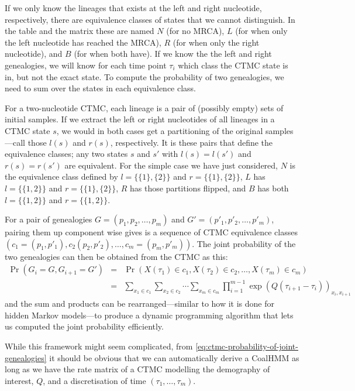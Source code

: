 \documentclass[graybox]{svmult}
\begin{document}
If we only know the lineages that exists at the left and right nucleotide, respectively, there are equivalence classes of states that we cannot distinguish. In the table and the matrix these are named $N$ (for no MRCA), $L$ (for when only the left nucleotide has reached the MRCA), $R$ (for when only the right nucleotide), and $B$ (for when both have). If we know the the left and right genealogies, we will know for each time point $\tau_i$ which class the CTMC state is in, but not the exact state. To compute the probability of two genealogies, we need to sum over the states in each equivalence class.


For a two-nucleotide CTMC, each lineage is a pair of (possibly empty) sets of initial samples. If we extract the left or right nucleotides of all lineages in a CTMC state $s$, we would in both cases get a partitioning of the original samples---call those $l(s)$ and $r(s)$, respectively. It is these pairs that define the equivalence classes; any two states $s$ and $s'$ with $l(s)=l(s')$ and $r(s)=r(s')$ are equivalent. For the simple case we have just considered, $N$ is the equivalence class defined by $l=\{\{1\},\{2\}\}$ and $r=\{\{1\},\{2\}\}$, $L$ has $l=\{\{1,2\}\}$ and $r=\{\{1\},\{2\}\}$, $R$ has those partitions flipped, and $B$ has both $l=\{\{1,2\}\}$ and $r=\{\{1,2\}\}$.

For a pair of genealogies $G=(p_1,p_2,\ldots,p_m)$ and $G'=(p'_1,p'_2,\ldots,p'_m)$, pairing them up component wise gives is a sequence of CTMC equivalence classes $(c_1=(p_1,p'_1),c_2(p_2,p'_2),\ldots,c_m=(p_m,p'_m))$. The joint probability of the two genealogies can then be obtained from the CTMC as this:
\begin{eqnarray}
	\Pr(G_i=G,G_{i+1}=G') &=& 
	\Pr(X(\tau_1)\in c_1,X(\tau_2)\in c_2,\ldots,X(\tau_m)\in c_m) \\
	&=& 
	\label{eq:ctmc-probability-of-joint-genealogies}
	\sum_{x_1\in c_1}\sum_{x_2\in c_2}\cdots\sum_{x_m\in c_m}
	\prod_{i=1}^{m-1} \exp\left(Q\left(\tau_{i+1}-\tau_i\right)\right)_{x_i,x_{i+1}}
\end{eqnarray}
and the sum and products can be rearranged---similar to how it is done for hidden Markov models---to produce a dynamic programming algorithm that lets us computed the joint probability efficiently.

While this framework might seem complicated, from \eqref{eq:ctmc-probability-of-joint-genealogies} it should be obvious that we can automatically derive a CoalHMM as long as we have the rate matrix of a CTMC modelling the demography of interest, $Q$, and a discretisation of time $(\tau_1,\ldots,\tau_m)$.
\end{document}
